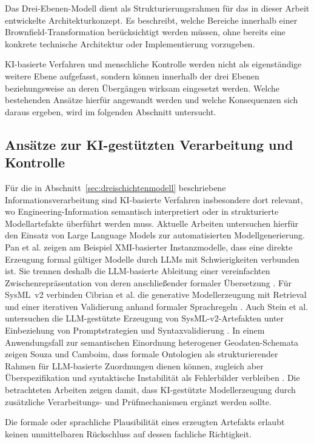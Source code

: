 Das Drei-Ebenen-Modell dient als Strukturierungsrahmen für das in dieser
Arbeit entwickelte Architekturkonzept. Es beschreibt, welche Bereiche
innerhalb einer Brownfield-Transformation berücksichtigt werden müssen, ohne
bereits eine konkrete technische Architektur oder Implementierung
vorzugeben.

KI-basierte Verfahren und menschliche Kontrolle werden nicht als
eigenständige weitere Ebene aufgefasst, sondern können innerhalb der drei
Ebenen beziehungsweise an deren Übergängen wirksam eingesetzt werden. Welche
bestehenden Ansätze hierfür angewandt werden und welche Konsequenzen sich
daraus ergeben, wird im folgenden Abschnitt untersucht.

\subsection{Ansätze zur KI-gestützten Verarbeitung und Kontrolle}
\label{sec:ki_kontrollmechanismen}

Für die in Abschnitt~\ref{sec:dreischichtenmodell} beschriebene
Informationsverarbeitung sind KI-basierte Verfahren insbesondere dort
relevant, wo Engineering-Information semantisch interpretiert oder in
strukturierte Modellartefakte überführt werden muss. Aktuelle Arbeiten
untersuchen hierfür den Einsatz von Large Language Models zur automatisierten
Modellgenerierung. Pan et al. zeigen am Beispiel XMI-basierter Instanzmodelle,
dass eine direkte Erzeugung formal gültiger Modelle durch LLMs mit
Schwierigkeiten verbunden ist. Sie trennen deshalb die LLM-basierte Ableitung
einer vereinfachten Zwischenrepräsentation von deren anschließender formaler
Übersetzung \cite{Pan.2025}. Für SysML~v2 verbinden Cibrian et al. die
generative Modellerzeugung mit Retrieval und einer iterativen Validierung
anhand formaler Sprachregeln \cite{Cibrian.2025}. Auch Stein et al.
untersuchen die LLM-gestützte Erzeugung von SysML-v2-Artefakten unter
Einbeziehung von Promptstrategien und Syntaxvalidierung \cite{Stein2026}. In
einem Anwendungsfall zur semantischen Einordnung heterogener
Geodaten-Schemata zeigen Souza und Camboim, dass formale Ontologien als
strukturierender Rahmen für LLM-basierte Zuordnungen dienen können, zugleich
aber Überspezifikation und syntaktische Instabilität als Fehlerbilder
verbleiben \cite{Souza.2026}. Die betrachteten Arbeiten zeigen damit, dass
KI-gestützte Modellerzeugung durch zusätzliche Verarbeitungs- und
Prüfmechanismen ergänzt werden sollte.

Die formale oder sprachliche Plausibilität eines erzeugten Artefakts erlaubt
keinen unmittelbaren Rückschluss auf dessen fachliche Richtigkeit. 

